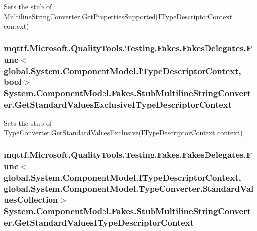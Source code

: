 Sets the stub of Multiline\-String\-Converter.\-Get\-Properties\-Supported(\-I\-Type\-Descriptor\-Context context)

\hypertarget{class_system_1_1_component_model_1_1_fakes_1_1_stub_multiline_string_converter_a4001c33f608de40abef0ad022f4c81c7}{
\subsubsection[{Get\-Standard\-Values\-Exclusive\-I\-Type\-Descriptor\-Context}]{\setlength{\rightskip}{0pt plus 5cm}mqttf.\-Microsoft.\-Quality\-Tools.\-Testing.\-Fakes.\-Fakes\-Delegates.\-Func$<$global.\-System.\-Component\-Model.\-I\-Type\-Descriptor\-Context, bool$>$ System.\-Component\-Model.\-Fakes.\-Stub\-Multiline\-String\-Converter.\-Get\-Standard\-Values\-Exclusive\-I\-Type\-Descriptor\-Context}}\label{class_system_1_1_component_model_1_1_fakes_1_1_stub_multiline_string_converter_a4001c33f608de40abef0ad022f4c81c7}


Sets the stub of Type\-Converter.\-Get\-Standard\-Values\-Exclusive(\-I\-Type\-Descriptor\-Context context)

\hypertarget{class_system_1_1_component_model_1_1_fakes_1_1_stub_multiline_string_converter_ace92269c67cb2bc6ae3317373222941e}{
\subsubsection[{Get\-Standard\-Values\-I\-Type\-Descriptor\-Context}]{\setlength{\rightskip}{0pt plus 5cm}mqttf.\-Microsoft.\-Quality\-Tools.\-Testing.\-Fakes.\-Fakes\-Delegates.\-Func$<$global.\-System.\-Component\-Model.\-I\-Type\-Descriptor\-Context, global.\-System.\-Component\-Model.\-Type\-Converter.\-Standard\-Values\-Collection$>$ System.\-Component\-Model.\-Fakes.\-Stub\-Multiline\-String\-Converter.\-Get\-Standard\-Values\-I\-Type\-Descriptor\-Context}}\label{class_system_1_1_component_model_1_1_fakes_1_1_stub_multiline_string_converter_ace92269c67cb2bc6ae3317373222941e}


